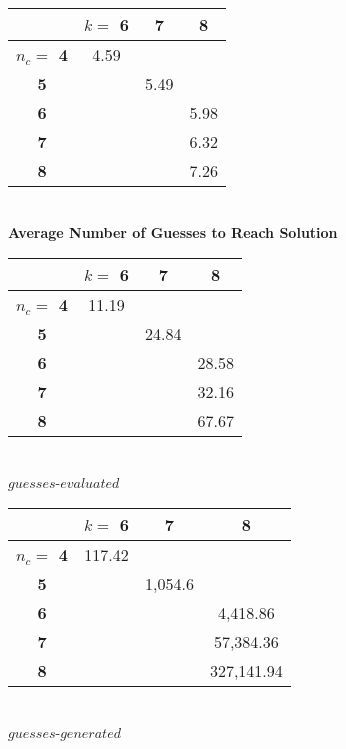 \documentclass[11pt,twocolumn]{article}
\begin{document}
\begin{center}
\begin{tabular}{|c|c|c|c|}
\hline
        & \bf $k= $ 6 & \bf 7 & \bf 8 \\
\hline
\bf $n_c = $ 4 & 4.59  &   &   \\
\hline
\bf 5       &       &5.49&   \\
\hline
\bf 6       &       &   &5.98 \\
\hline
\bf 7       &       &   &6.32 \\
\hline
\bf 8       &       &   &7.26 \\
\hline
\end{tabular}\\
\bf Average Number of Guesses to Reach Solution \rm\\
\vspace{.7cm}

\begin{tabular}{|c|c|c|c|}
\hline
        &\bf  $k= $ 6 & \bf 7 & \bf 8 \\
\hline
\bf $n_c = $ 4 & 11.19   &   &   \\
\hline
\bf 5       &       &24.84&   \\
\hline
\bf 6       &       &   &28.58 \\
\hline
\bf 7       &       &   &32.16 \\
\hline
\bf 8       &       &   &67.67 \\
\hline
\end{tabular}\\
$guesses$-$evaluated$\\
\vspace{.7cm}


\begin{tabular}{|c|c|c|c|}
\hline
        &\bf $k= $ 6 &\bf 7 &\bf 8 \\
\hline
\bf $n_c = $ 4 & 117.42   &   &   \\
\hline
\bf 5       &       &1,054.6&   \\
\hline
\bf 6       &       &   &4,418.86 \\
\hline
\bf 7       &       &   &57,384.36 \\
\hline
\bf 8       &       &   &327,141.94 \\
\hline
\end{tabular}\\
$guesses$-$generated$
\end{center}
\end{document}
